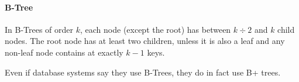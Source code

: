 \paragraph{B-Tree}
In B-Trees of order $k$, each node (except the root) has between $k \div 2$ and $k$ child nodes.
The root node has at least two children, unless it is also a leaf and any non-leaf node contains at exactly $k - 1$ keys.

Even if database systems say they use B-Trees, they do in fact use B+ trees.
